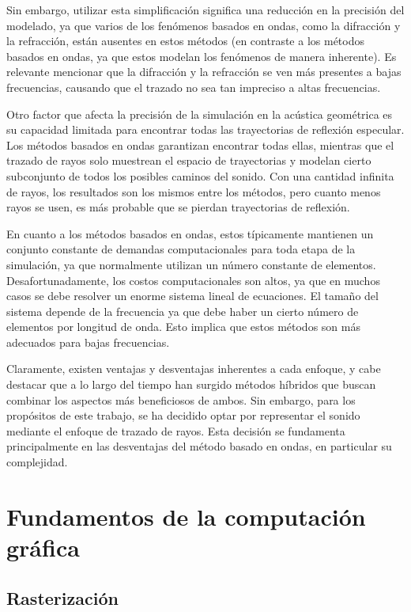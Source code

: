\documentclass{prgrado}
\begin{document}
Sin embargo, utilizar esta simplificación significa una reducción en la precisión del modelado, ya que varios de los fenómenos basados en ondas, como la difracción y la refracción, están ausentes en estos métodos (en contraste a los métodos basados en ondas, ya que estos modelan los fenómenos de manera inherente). Es relevante mencionar que la difracción y la refracción se ven más presentes a bajas frecuencias, causando que el trazado no sea tan impreciso a altas frecuencias.

Otro factor que afecta la precisión de la simulación en la acústica geométrica es su capacidad limitada para encontrar todas las trayectorias de reflexión especular. Los métodos basados en ondas garantizan encontrar todas ellas, mientras que el trazado de rayos solo muestrean el espacio de trayectorias y modelan cierto subconjunto de todos los posibles caminos del sonido. Con una cantidad infinita de rayos, los resultados son los mismos entre los métodos, pero cuanto menos rayos se usen, es más probable que se pierdan trayectorias de reflexión.

En cuanto a los métodos basados en ondas, estos típicamente mantienen un conjunto constante de demandas computacionales para toda etapa de la simulación, ya que normalmente utilizan un número constante de elementos. Desafortunadamente, los costos computacionales son altos, ya que en muchos casos se debe resolver un enorme sistema lineal de ecuaciones. El tamaño del sistema depende de la frecuencia ya que debe haber un cierto número de elementos por longitud de onda. Esto implica que estos métodos son más adecuados para bajas frecuencias.

Claramente, existen ventajas y desventajas inherentes a cada enfoque, y cabe destacar que a lo largo del tiempo han surgido métodos híbridos que buscan combinar los aspectos más beneficiosos de ambos. Sin embargo, para los propósitos de este trabajo, se ha decidido optar por representar el sonido mediante el enfoque de trazado de rayos. Esta decisión se fundamenta principalmente en las  desventajas del método basado en ondas, en particular su complejidad.

\section{Fundamentos de la computación gráfica}

\subsection{Rasterización}
\end{document}

